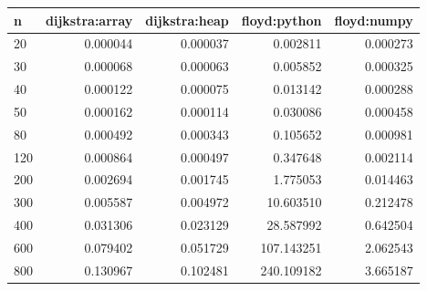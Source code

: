 \begin{tabular}{lrrrr}
\hline
n & dijkstra:array & dijkstra:heap & floyd:python & floyd:numpy \\
\hline
20 & 0.000044 & 0.000037 & 0.002811 & 0.000273 \\
30 & 0.000068 & 0.000063 & 0.005852 & 0.000325 \\
40 & 0.000122 & 0.000075 & 0.013142 & 0.000288 \\
50 & 0.000162 & 0.000114 & 0.030086 & 0.000458 \\
80 & 0.000492 & 0.000343 & 0.105652 & 0.000981 \\
120 & 0.000864 & 0.000497 & 0.347648 & 0.002114 \\
200 & 0.002694 & 0.001745 & 1.775053 & 0.014463 \\
300 & 0.005587 & 0.004972 & 10.603510 & 0.212478 \\
400 & 0.031306 & 0.023129 & 28.587992 & 0.642504 \\
600 & 0.079402 & 0.051729 & 107.143251 & 2.062543 \\
800 & 0.130967 & 0.102481 & 240.109182 & 3.665187 \\
\hline
\end{tabular}
